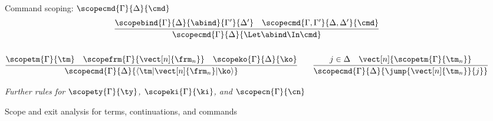 \documentclass{article}
\begin{document}
\begin{figure}
Command scoping: $\scopecmd{\Gamma}{\Delta}{\cmd}$
\begin{gather*}
  \infer
  {\scopecmd{\Gamma}{\Delta}{\Let \abind \In \cmd}}
  {
    \scopebind{\Gamma}{\Delta}{\abind}{\Gamma'}{\Delta'}
    &
    \scopecmd{\Gamma,\Gamma'}{\Delta,\Delta'}{\cmd}
  }
  \\\\
  \infer
  {\scopecmd{\Gamma}{\Delta}{\braket{\tm | \vect[n]{\frm_n} | \ko}}}
  {
    \scopetm{\Gamma}{\tm}
    &
    \scopefrm{\Gamma}{\vect[n]{\frm_n}}
    &
    \scopeko{\Gamma}{\Delta}{\ko}
  }
  \qquad
  \infer
  {\scopecmd{\Gamma}{\Delta}{\jump{\vect[n]{\tm_n}}{j}}}
  {
    j \in \Delta
    &
    \vect[n]{
      \scopetm{\Gamma}{\tm_n}
    }
  }
\end{gather*}


\emph{Further rules for $\scopety{\Gamma}{\ty}$, $\scopeki{\Gamma}{\ki}$, and
  $\scopecn{\Gamma}{\cn}$}
\caption{Scope and exit analysis for terms, continuations, and commands}
\label{fig:scoping-rules}
\end{figure}
\end{document}
